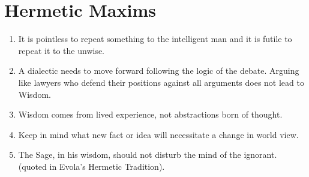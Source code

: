\section{Hermetic Maxims}

\begin{enumerate}

\item It is pointless to repeat something to the intelligent man and it is futile to repeat it to the unwise.

\item A dialectic needs to move forward following the logic of the debate. Arguing like lawyers who defend their positions against all arguments does not lead to Wisdom.

\item Wisdom comes from lived experience, not abstractions born of thought.

\item Keep in mind what new fact or idea will necessitate a change in world view.

\item The Sage, in his wisdom, should not disturb the mind of the ignorant. (quoted in Evola's Hermetic Tradition).
\end{enumerate}





